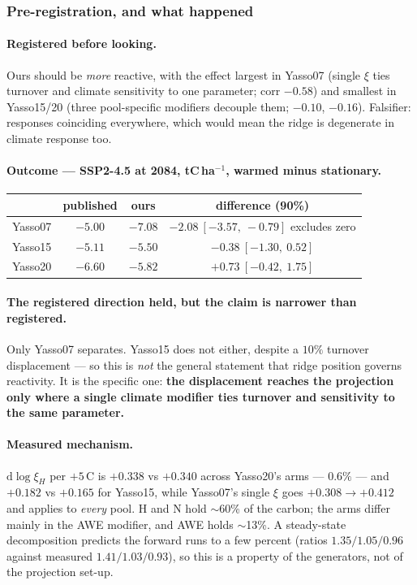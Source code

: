 \documentclass[11pt]{article}
\begin{document}
\subsubsection{Pre-registration, and what happened}
\paragraph{Registered before looking.} Ours should be \emph{more} reactive, with the effect largest
in Yasso07 (single $\xi$ ties turnover and climate sensitivity to one parameter; corr $-0.58$) and
smallest in Yasso15/20 (three pool-specific modifiers decouple them; $-0.10$, $-0.16$). Falsifier:
responses coinciding everywhere, which would mean the ridge is degenerate in climate response too.

\paragraph{Outcome --- SSP2-4.5 at 2084, tC\,ha$^{-1}$, warmed minus stationary.}
\begin{center}\small
\begin{tabular}{lccc}
\hline
& published & ours & difference (90\%) \\
\hline
Yasso07 & $-5.00$ & $-7.08$ & $\mathbf{-2.08\ [-3.57,\ -0.79]}$ \quad excludes zero \\
Yasso15 & $-5.11$ & $-5.50$ & $-0.38\ [-1.30,\ 0.52]$ \\
Yasso20 & $-6.60$ & $-5.82$ & $+0.73\ [-0.42,\ 1.75]$ \\
\hline
\end{tabular}
\end{center}

\paragraph{The registered direction held, but the claim is narrower than registered.} Only Yasso07
separates. Yasso15 does not either, despite a $10\%$ turnover displacement --- so this is \emph{not}
the general statement that ridge position governs reactivity. It is the specific one: \textbf{the
displacement reaches the projection only where a single climate modifier ties turnover and
sensitivity to the same parameter.}

\paragraph{Measured mechanism.} $\mathrm{d}\log\xi_H$ per $+5$\,\textdegree C is $+0.338$ vs
$+0.340$ across Yasso20's arms --- $0.6\%$ --- and $+0.182$ vs $+0.165$ for Yasso15, while Yasso07's
single $\xi$ goes $+0.308 \to +0.412$ and applies to \emph{every} pool. H and N hold $\sim$60\% of
the carbon; the arms differ mainly in the AWE modifier, and AWE holds $\sim$13\%. A steady-state
decomposition predicts the forward runs to a few percent (ratios $1.35/1.05/0.96$ against measured
$1.41/1.03/0.93$), so this is a property of the generators, not of the projection set-up.
\end{document}
